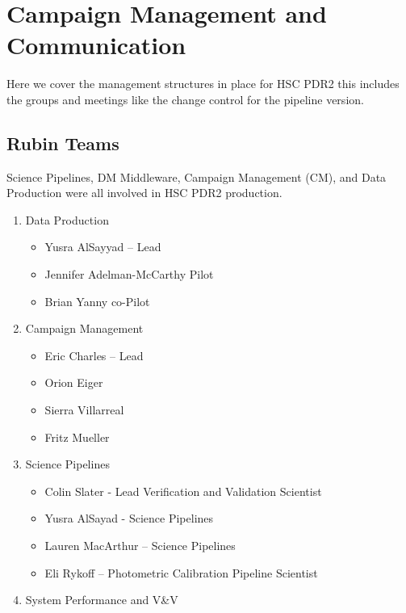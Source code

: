 \section{Campaign Management and Communication} \label{sec:management}

Here we cover the management structures in place for HSC PDR2 
this includes the groups and meetings like the change control for 
the pipeline version.

\subsection{Rubin Teams}

Science Pipelines, DM Middleware, Campaign Management (CM), and Data Production
were all involved in HSC PDR2 production.

\begin{enumerate}


\item Data Production


\begin{itemize}
\item Yusra AlSayyad -- Lead
\item Jennifer Adelman-McCarthy Pilot
\item Brian Yanny co-Pilot
\end{itemize}


\item Campaign Management

\begin{itemize}
\item Eric Charles -- Lead
\item Orion Eiger
\item Sierra Villarreal
\item Fritz Mueller
\end{itemize}

\item Science Pipelines

\begin{itemize}
\item Colin Slater - Lead Verification and Validation Scientist
\item Yusra AlSayad - Science Pipelines 
\item Lauren MacArthur -- Science Pipelines
\item Eli Rykoff -- Photometric Calibration Pipeline Scientist
\end{itemize}

\item System Performance and V\&V


\end{enumerate}
